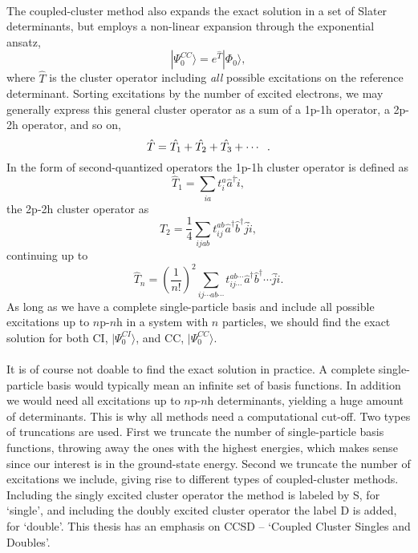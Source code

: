 \paragraph*{}
The coupled-cluster method also expands the exact solution in a set of Slater determinants, but employs a non-linear expansion through the exponential ansatz,
\begin{equation}
\label{eq:CC:expon}
|\Psi_0^{CC} \rangle = e^{\hat{T}} |\Phi_0 \rangle ,
\end{equation}
where $\hat{T}$ is the cluster operator including \textit{all} possible excitations on the reference determinant.
Sorting excitations by the number of excited electrons, we may generally express this general cluster operator as a sum of a 1p-1h operator, a 2p-2h operator, and so on,
\begin{equation}
\hat{T} = \hat{T_1} + \hat{T_2} + \hat{T_3} + \cdots \hspace{2mm}.
\end{equation}
In the form of second-quantized operators the 1p-1h cluster operator is defined as
\begin{equation}
\hat{T}_1 = \sum_{ia} t_i^a \hat{a}^{\dagger} \hat{i},
\end{equation}
the 2p-2h cluster operator as
\begin{equation}
\hat{T}_2 = \frac{1}{4} \sum_{ijab} t_{ij}^{ab} \hat{a}^{\dagger} \hat{b}^{\dagger} \hat{j} \hat{i},
\end{equation}
continuing up to 
\begin{equation}
\hat{T}_n = \left( \frac{1}{n!}\right)^2 \sum_{ij\cdots ab\cdots} t_{ij\cdots}^{ab\cdots} \hat{a}^{\dagger} \hat{b}^{\dagger} \cdots \hat{j} \hat{i} .
\end{equation}
As long as we have a complete single-particle basis and include all possible excitations up to $n$p-$n$h in a system with $n$ particles, we should find the exact solution for both CI, $|\Psi_0^{CI}\rangle$, and CC, $|\Psi_0^{CC}\rangle$.

\paragraph*{}
It is of course not doable to find the exact solution in practice.
A complete single-particle basis would typically mean an infinite set of basis functions.
In addition we would need all excitations up to $n$p-$n$h determinants, yielding a huge amount of determinants. 
This is why all methods need a computational cut-off.
Two types of truncations are used.
First we truncate the number of single-particle basis functions, throwing away the ones with the highest energies, which makes sense since our interest is in the ground-state energy.
Second we truncate the number of excitations we include, giving rise to different types of coupled-cluster methods.
Including the singly excited cluster operator the method is labeled by S, for `single', and including the doubly excited cluster operator the label D is added, for `double'.
This thesis has an emphasis on CCSD -- `Coupled Cluster Singles and Doubles'.

